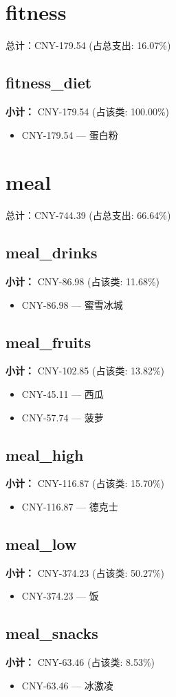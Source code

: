 \documentclass[12pt]{article}
\begin{document}
\section*{fitness}
总计：CNY-179.54 	 (占总支出: 16.07\%)

\subsection*{fitness\_diet}
\textbf{小计：} CNY-179.54 (占该类: 100.00\%)
\begin{itemize}
    \item CNY-179.54 --- 蛋白粉
\end{itemize}
\section*{meal}
总计：CNY-744.39 	 (占总支出: 66.64\%)

\subsection*{meal\_drinks}
\textbf{小计：} CNY-86.98 (占该类: 11.68\%)
\begin{itemize}
    \item CNY-86.98 --- 蜜雪冰城
\end{itemize}
\subsection*{meal\_fruits}
\textbf{小计：} CNY-102.85 (占该类: 13.82\%)
\begin{itemize}
    \item CNY-45.11 --- 西瓜
    \item CNY-57.74 --- 菠萝
\end{itemize}
\subsection*{meal\_high}
\textbf{小计：} CNY-116.87 (占该类: 15.70\%)
\begin{itemize}
    \item CNY-116.87 --- 德克士
\end{itemize}
\subsection*{meal\_low}
\textbf{小计：} CNY-374.23 (占该类: 50.27\%)
\begin{itemize}
    \item CNY-374.23 --- 饭
\end{itemize}
\subsection*{meal\_snacks}
\textbf{小计：} CNY-63.46 (占该类: 8.53\%)
\begin{itemize}
    \item CNY-63.46 --- 冰激凌
\end{itemize}
\end{document}

